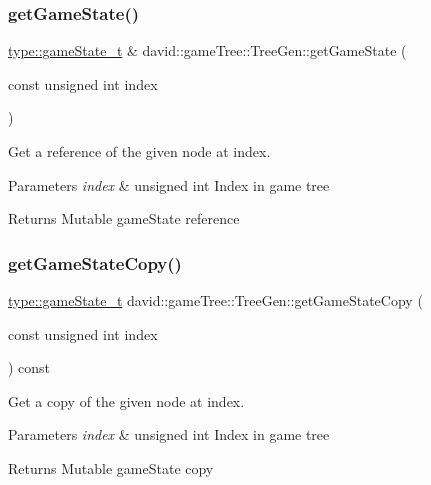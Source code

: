 \subsubsection{\texorpdfstring{get\+Game\+State()}{getGameState()}}
{\footnotesize\ttfamily \hyperlink{structdavid_1_1bitboard_1_1gameState}{type\+::game\+State\+\_\+t} \& david\+::game\+Tree\+::\+Tree\+Gen\+::get\+Game\+State (\begin{DoxyParamCaption}\item[{const unsigned int}]{index }\end{DoxyParamCaption})}

Get a reference of the given node at index.


\begin{DoxyParams}{Parameters}
{\em index} & unsigned int Index in game tree \\
\hline
\end{DoxyParams}
\begin{DoxyReturn}{Returns}
Mutable game\+State reference 
\end{DoxyReturn}
\mbox{\label{classdavid_1_1gameTree_1_1TreeGen_a8c9344951f5f5ae2cdf77dbfb06f21a1}} 
\subsubsection{\texorpdfstring{get\+Game\+State\+Copy()}{getGameStateCopy()}}
{\footnotesize\ttfamily \hyperlink{structdavid_1_1bitboard_1_1gameState}{type\+::game\+State\+\_\+t} david\+::game\+Tree\+::\+Tree\+Gen\+::get\+Game\+State\+Copy (\begin{DoxyParamCaption}\item[{const unsigned int}]{index }\end{DoxyParamCaption}) const}

Get a copy of the given node at index.


\begin{DoxyParams}{Parameters}
{\em index} & unsigned int Index in game tree \\
\hline
\end{DoxyParams}
\begin{DoxyReturn}{Returns}
Mutable game\+State copy 
\end{DoxyReturn}
\mbox{\label{classdavid_1_1gameTree_1_1TreeGen_ae5b4ec70914ac495f83199db48f9a475}} 
